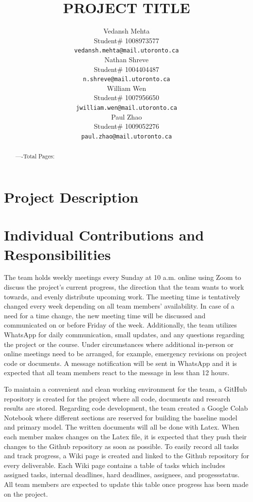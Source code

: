 \documentclass{article} %
\title{PROJECT TITLE}
\author{Vedansh Mehta  \\
Student\# 1008973577 \\
\texttt{vedansh.mehta@mail.utoronto.ca} \\
\And
Nathan Shreve  \\
Student\# 1004404487 \\
\texttt{n.shreve@mail.utoronto.ca} \\
\AND
William Wen  \\
Student\# 1007956650 \\
\texttt{jwilliam.wen@mail.utoronto.ca} \\
\And
Paul Zhao \\
Student\# 1009052276 \\
\texttt{paul.zhao@mail.utoronto.ca} \\
\AND
}
\begin{document}
\maketitle

\begin{abstract}
    ----Total Pages: \pageref{last_page}
\end{abstract}



\section{Project Description}


\section{Individual Contributions and Responsibilities}

The team holds weekly meetings every Sunday at 10 a.m. online using Zoom to discuss the project's current progress, the direction that the team wants to work towards, and evenly distribute upcoming work. The meeting time is tentatively changed every week depending on all team members’ availability. In case of a need for a time change, the new meeting time will be discussed and communicated on or before Friday of the week. Additionally, the team utilizes WhatsApp for daily communication, small updates, and any questions regarding the project or the course. Under circumstances where additional in-person or online meetings need to be arranged, for example, emergency revisions on project code or documents. A message notification will be sent in WhatsApp and it is expected that all team members react to the message in less than 12 hours.

To maintain a convenient and clean working environment for the team, a GitHub repository is created for the project where all code, documents and research results are stored. Regarding code development, the team created a Google Colab Notebook where different sections are reserved for building the baseline model and primary model. The written documents will all be done with Latex. When each member makes changes on the Latex file, it is expected that they push their changes to the Github repository as soon as possible. To easily record all tasks and track progress, a Wiki page is created and linked to the Github repository for every deliverable. Each Wiki page contains a table of tasks which includes assigned tasks, internal deadlines, hard deadlines, assignees, and  progessstatus. All team members are expected to update this table once progress has been made on the project.
\end{document}
